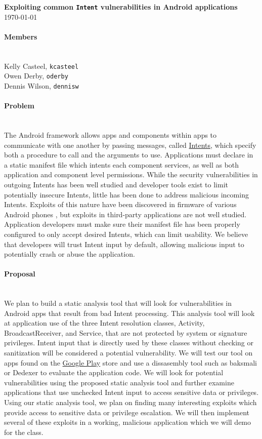 \documentclass[12pt,a4paper]{article}
\begin{document}


\flushleft\textbf{Exploiting common \texttt{Intent} vulnerabilities in Android %
applications}\\
\today\\

\paragraph{Members} ~\\

Kelly Casteel, \texttt{kcasteel}\\
Owen Derby, \texttt{oderby}\\
Dennis Wilson, \texttt{dennisw}\\

\paragraph{Problem} ~\\
The Android framework allows apps and components within apps to communicate with
one another by passing messages, called
\href{https://developer.android.com/reference/android/content/Intent.html}{Intents},
which specify both a procedure to call and the arguments to use. Applications
must declare in a static manifest file which intents each component services, as
well as both application and component level permissions. While the security
vulnerabilities in outgoing Intents has been well studied
\cite{chin_analyzing_2011} and developer tools exist to limit potentially
insecure Intents, little has been done to address malicious incoming
Intents. Exploits of this nature have been discovered in firmware of various
Android phones \cite{grace_systematic_2012}, but exploits in third-party
applications are not well studied. Application developers must make sure their
manifest file has been properly configured to only accept desired Intents, which
can limit usability. We believe that developers will trust Intent input by
default, allowing malicious input to potentially crash or abuse the application.

\paragraph{Proposal} ~\\
We plan to build a static analysis tool that will look for vulnerabilities in
Android apps that result from bad Intent processing. This analysis tool will
look at application use of the three Intent resolution classes, Activity,
BroadcastReceiver, and Service, that are not protected by system or signature
privileges. Intent input that is directly used by these classes without checking
or sanitization will be considered a potential vulnerability. We will test our
tool on apps found on the \href{https://play.google.com/store/apps}{Google Play}
store and use a dissasembly tool such as baksmali \cite{baksmali} or
Dedexer \cite{dedexer} to evaluate the application code. We will look for
potential vulnerabilities using the proposed static analysis tool and further
examine applications that use unchecked Intent input to access sensitive data or
privileges.\\

Using our static analysis tool, we plan on finding many interesting exploits
which provide access to sensitive data or privilege escalation. We will then
implement several of these exploits in a working, malicious application which we
will demo for the class.


\end{document}
